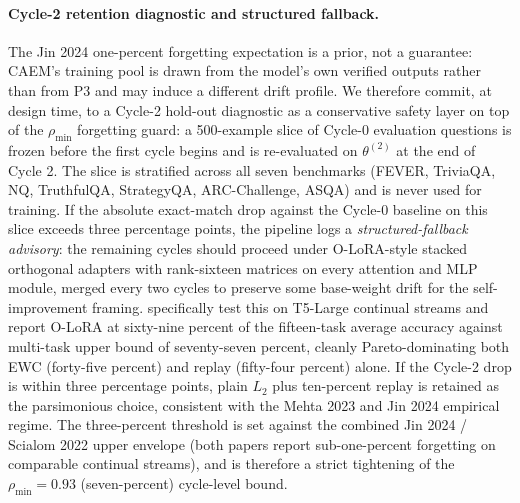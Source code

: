 \paragraph{Cycle-2 retention diagnostic and structured fallback.}
The Jin 2024 one-percent forgetting expectation is a prior, not a
guarantee: CAEM's training pool is drawn from the model's own verified
outputs rather than from P3 and may induce a different drift profile.
We therefore commit, at design time, to a Cycle-2 hold-out diagnostic
as a conservative safety layer on top of the $\rho_{\min}$ forgetting
guard: a 500-example slice of Cycle-0 evaluation questions is frozen
before the first cycle begins and is re-evaluated on $\theta^{(2)}$ at
the end of Cycle 2. The slice is stratified across all seven benchmarks
(FEVER, TriviaQA, NQ, TruthfulQA, StrategyQA, ARC-Challenge, ASQA)
and is never used for training. If the absolute exact-match drop
against the Cycle-0 baseline on this slice exceeds three percentage
points, the pipeline logs a \emph{structured-fallback advisory}: the
remaining cycles should proceed under O-LoRA-style stacked orthogonal
adapters \citep{wang2023olora,biderman2024lora} with rank-sixteen
matrices on every attention and MLP module, merged every two cycles
to preserve some base-weight drift for the self-improvement
framing. \citet{wang2023olora} specifically test this on T5-Large
continual streams and report O-LoRA at sixty-nine percent of the
fifteen-task average accuracy against multi-task upper bound of
seventy-seven percent, cleanly Pareto-dominating both EWC
(forty-five percent) and replay (fifty-four percent) alone. If the
Cycle-2 drop is within three percentage points, plain $L_{2}$ plus
ten-percent replay is retained as the parsimonious choice, consistent
with the Mehta 2023 and Jin 2024 empirical regime. The three-percent
threshold is set against the combined Jin 2024 / Scialom 2022
upper envelope (both papers report sub-one-percent forgetting on
comparable continual streams), and is therefore a strict tightening
of the $\rho_{\min} = 0.93$ (seven-percent) cycle-level bound.

